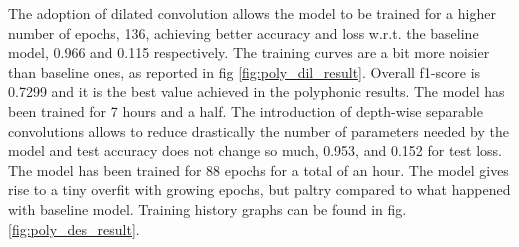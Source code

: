 \documentclass{article}
\begin{document}
The adoption of dilated convolution allows the model to be trained for a higher number of epochs, 136, achieving better accuracy and loss w.r.t. the baseline model, 0.966 and 0.115 respectively. The training curves are a bit more noisier than baseline ones, as reported in fig \ref{fig:poly_dil_result}.\newline
Overall f1-score is 0.7299 and it is the best value achieved in the polyphonic results. The model has been trained for 7 hours and a half.\newline
The introduction of depth-wise separable convolutions allows to reduce drastically the number of parameters needed by the model and test accuracy does not change so much, 0.953, and 0.152 for test loss. The model has been trained for 88 epochs for a total of an hour. The model gives rise to a tiny overfit with growing epochs, but paltry compared to what happened with baseline model. Training history graphs can be found in fig. \ref{fig:poly_des_result}.
\end{document}
